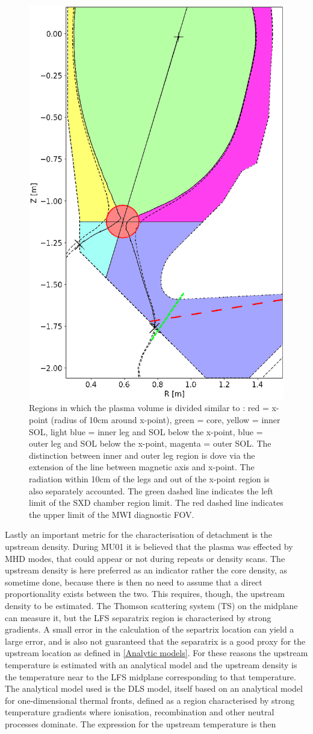 \begin{figure}
	\centering
	\includegraphics[trim={0 0 0 0},clip,width=0.4\linewidth]{Chapters/chapter2/figs/IRVB_regions_divided2.png}
	\caption{Regions in which the plasma volume is divided similar to \cite{Harrison2011}: red = x-point (radius of 10cm around x-point), green = core, yellow = inner SOL, light blue = inner leg and SOL below the x-point, blue = outer leg and SOL below the x-point, magenta = outer SOL. The distinction between inner and outer leg region is dove via the extension of the line between magnetic axis and x-point. The radiation within 10cm of the legs and out of the x-point region is also separately accounted. The green dashed line indicates the left limit of the SXD chamber region limit. The red dashed line indicates the upper limit of the MWI diagnostic FOV.}
	\label{fig:IRVB_regions_divided}
\end{figure}

Lastly an important metric for the characterisation of detachment is the upstream density. During MU01 it is believed that the plasma was effected by MHD modes, that could appear or not during repeats or density scans. The upstream density is here preferred as an indicator rather the core density, as sometime done, because there is then no need to assume that a direct proportionality exists between the two. This requires, though, the upstream density to be estimated. The Thomson scattering system (TS) on the midplane can measure it, but the LFS separatrix region is characterised by strong gradients. A small error in the calculation of the separtrix location can yield a large error, and is also not guaranteed that the separatrix is a good proxy for the upstream location as defined in \autoref{Analytic models}. For these reasons the upstream temperature is estimated with an analytical model and the upstream density is the temperature near to the LFS midplane corresponding to that temperature. The analytical model used is the DLS model\cite{Lipschultz2016}, itself based on an analytical model for one-dimensional thermal fronts, defined as a region characterised by strong temperature gradients where ionisation, recombination and other neutral processes dominate.\cite{Hutchinson1994} The expression for the upstream temperature is then

